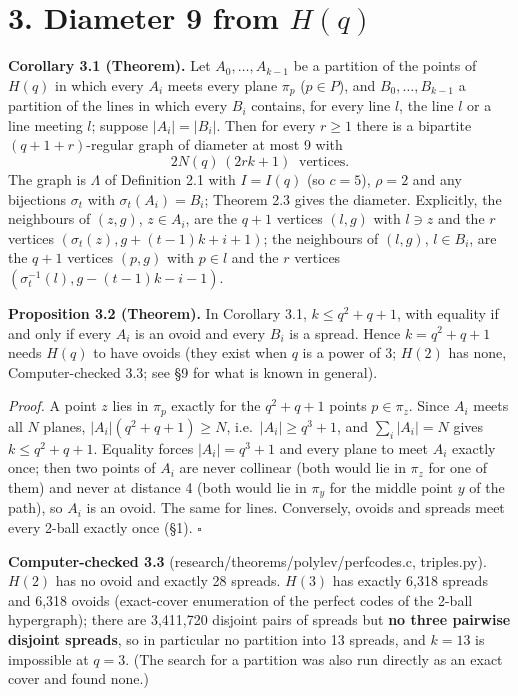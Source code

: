 \documentclass[
  10pt,
]{article}
\begin{document}
\hypertarget{diameter-9-from-hq}{%
\section{\texorpdfstring{3. Diameter 9 from
\(H(q)\)}{3. Diameter 9 from H(q)}}\label{diameter-9-from-hq}}

\textbf{Corollary 3.1 (Theorem).} Let \(A_0,\dots,A_{k-1}\) be a
partition of the points of \(H(q)\) in which every \(A_i\) meets every
plane \(\pi_p\) (\(p\in P\)), and \(B_0,\dots,B_{k-1}\) a partition of
the lines in which every \(B_i\) contains, for every line \(l\), the
line \(l\) or a line meeting \(l\); suppose \(|A_i| = |B_i|\). Then for
every \(r\ge 1\) there is a bipartite \((q+1+r)\)-regular graph of
diameter at most 9 with \[2N(q)\,(2rk+1)\ \text{ vertices.}\] The graph
is \(\Lambda\) of Definition 2.1 with \(I = I(q)\) (so \(c = 5\)),
\(\rho = 2\) and any bijections \(\sigma_t\) with
\(\sigma_t(A_i) = B_i\); Theorem 2.3 gives the diameter. Explicitly, the
neighbours of \((z,g)\), \(z\in A_i\), are the \(q+1\) vertices
\((l,g)\) with \(l\ni z\) and the \(r\) vertices
\((\sigma_t(z), g+(t-1)k+i+1)\); the neighbours of \((l,g)\),
\(l\in B_i\), are the \(q+1\) vertices \((p,g)\) with \(p\in l\) and the
\(r\) vertices \((\sigma_t^{-1}(l), g-(t-1)k-i-1)\).

\textbf{Proposition 3.2 (Theorem).} In Corollary 3.1, \(k\le q^2+q+1\),
with equality if and only if every \(A_i\) is an ovoid and every \(B_i\)
is a spread. Hence \(k = q^2+q+1\) needs \(H(q)\) to have ovoids (they
exist when \(q\) is a power of 3; \(H(2)\) has none, Computer-checked
3.3; see §9 for what is known in general).

\emph{Proof.} A point \(z\) lies in \(\pi_p\) exactly for the
\(q^2+q+1\) points \(p\in\pi_z\). Since \(A_i\) meets all \(N\) planes,
\(|A_i|(q^2+q+1)\ge N\), i.e.~\(|A_i|\ge q^3+1\), and
\(\sum_i|A_i| = N\) gives \(k\le q^2+q+1\). Equality forces
\(|A_i| = q^3+1\) and every plane to meet \(A_i\) exactly once; then two
points of \(A_i\) are never collinear (both would lie in \(\pi_z\) for
one of them) and never at distance 4 (both would lie in \(\pi_y\) for
the middle point \(y\) of the path), so \(A_i\) is an ovoid. The same
for lines. Conversely, ovoids and spreads meet every 2-ball exactly once
(§1). \(\square\)

\textbf{Computer-checked 3.3} (research/theorems/polylev/perfcodes.c,
triples.py). \(H(2)\) has no ovoid and exactly 28 spreads. \(H(3)\) has
exactly 6,318 spreads and 6,318 ovoids (exact-cover enumeration of the
perfect codes of the 2-ball hypergraph); there are 3,411,720 disjoint
pairs of spreads but \textbf{no three pairwise disjoint spreads}, so in
particular no partition into 13 spreads, and \(k = 13\) is impossible at
\(q = 3\). (The search for a partition was also run directly as an exact
cover and found none.)
\end{document}
